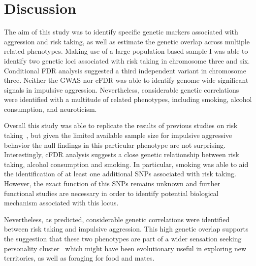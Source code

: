 \section{Discussion}
\label{sec:ukb_assc_discussion}

The aim of this study was to identify specific genetic markers associated with aggression and risk taking,
as well as estimate the genetic overlap across multiple related phenotypes.
Making use of a large population based sample I was able to identify two genetic loci associated with risk taking in chromosome three and six.
Conditional FDR analysis suggested a third independent variant in chromosome three.
Neither the GWAS nor cFDR was able to identify genome wide significant signals in impulsive aggression.
Nevertheless, considerable genetic correlations were identified with a multitude of related phenotypes, including smoking, alcohol consumption, and neuroticism.

Overall this study was able to replicate the results of previous studies on risk taking~\cite{Day2016}, but given the limited available sample size for impulsive aggressive behavior the null findings in this particular phenotype are not surprising.
Interestingly, cFDR analysis suggests a close genetic relationship between risk taking, alcohol consumption and smoking.
In particular, smoking was able to aid the identification of at least one additional SNPs associated with risk taking.
However, the exact function of this SNPs remains unknown and further functional studies are necessary in order to identify potential biological mechanism associated with this locus.

Nevertheless, as predicted, considerable genetic correlations were identified between risk taking and impulsive aggression.
This high genetic overlap supports the suggestion that these two phenotypes are part of a wider sensation seeking personality cluster~\cite{Zuckerman2000} which might have been evolutionary useful in exploring new territories, as well as foraging for food and mates.

